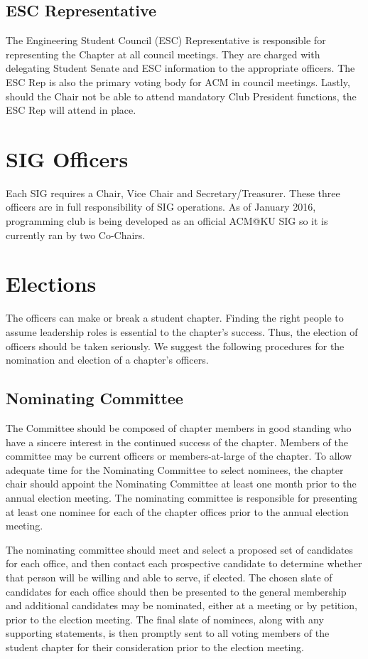 \subsection*{ESC Representative}
The Engineering Student Council (ESC) Representative is responsible for
representing the Chapter at all council meetings. They are charged with
delegating Student Senate and ESC information to the appropriate officers.
The ESC Rep is also the primary voting body for ACM in council meetings. Lastly,
should the Chair not be able to attend mandatory \“Club President\” functions,
the ESC Rep will attend in place.

\section*{SIG Officers}
Each SIG requires a Chair, Vice Chair and Secretary/Treasurer. These three
officers are in full responsibility of SIG operations. As of January 2016,
programming club is being developed as an official ACM@KU SIG so it is currently
ran by two Co-Chairs.

\section{Elections}

The officers can make or break a student chapter. Finding the right people to
assume leadership roles is essential to the chapter's success. Thus, the
election of officers should be taken seriously. We suggest the following
procedures for the nomination and election of a chapter's officers.

\subsection*{Nominating Committee}
The Committee should be composed of chapter members in good standing who have a
sincere interest in the continued success of the chapter. Members of the committee
may be current officers or members-at-large of the chapter. To allow adequate time
for the Nominating Committee to select nominees, the chapter chair should appoint
the Nominating Committee at least one month prior to the annual election meeting.
The nominating committee is responsible for presenting at least one nominee for
each of the chapter offices prior to the annual election meeting.

The nominating committee should meet and select a proposed set of candidates for
each office, and then contact each prospective candidate to determine whether
that person will be willing and able to serve, if elected. The chosen slate of
candidates for each office should then be presented to the general membership
and additional candidates may be nominated, either at a meeting or by petition,
prior to the election meeting. The final slate of nominees, along with any
supporting statements, is then promptly sent to all voting members of the student
chapter for their consideration prior to the election meeting.

